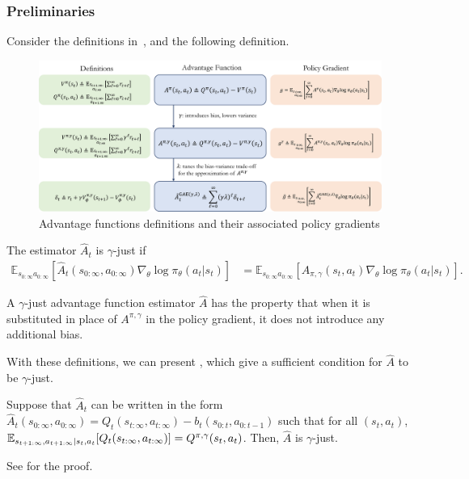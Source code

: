 \documentclass{article}
\begin{document}
\vspace{10pt}
\subsubsection{Preliminaries}
Consider the definitions in~, and the following definition.

\begin{figure}[h]
    \centering
    \includegraphics[width=1.0\linewidth]{Figures/GAE_table.png}
    \caption{Advantage functions definitions and their associated policy gradients}
    \label{fig:gae_summary}
\end{figure}

\begin{definition} 
The estimator $\hat{A}_t$ is $\gamma$-just if
\begin{align*}
\mathbb{E}_{s_{0:\infty} a_{0:\infty}} [\hat{A}_t(s_{0:\infty}, a_{0:\infty}) \nabla_{\theta} \log \pi_{\theta}(a_t | s_t) ] &= \mathbb{E}_{s_{0:\infty} a_{0:\infty}} [A_{\pi,\gamma}(s_t, a_t) \nabla_{\theta} \log \pi_{\theta}(a_t | s_t)].
\end{align*}
\end{definition}

A $\gamma$-just advantage function estimator $\hat{A}$ has the property that when it is substituted in place of $A^{\pi,\gamma}$ in the policy gradient, it does not introduce any additional bias.

With these definitions, we can present , which give a sufficient condition for $\hat A$ to be $\gamma$-just.

\begin{proposition}\label{prop:GAE_prop}
    Suppose that $\hat A_t$ can be written in the form $\hat A_t(s_{0:\infty},a_{0:\infty}) = Q_t(s_{t:\infty},a_{t:\infty}) - b_t(s_{0:t},a_{0:t-1})$ such that for all $(s_t,a_t)$, ${\mathbb E}_{s_{t+1:\infty}, a_{t+1:\infty}\vert {s_t, a_t}}[Q_t(s_{t:\infty},a_{t:\infty})] = Q^{\pi, \gamma}(s_t, a_t)$. Then, $\hat A$ is $\gamma$-just.
\end{proposition}
See \cite{schulman2015high} for the proof.
\end{document}
